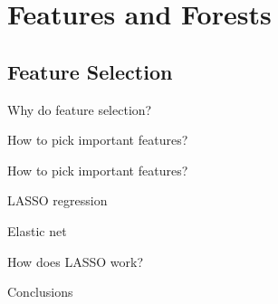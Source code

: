 \section{Features and Forests}
\subsection{Feature Selection}
\begin{frame}[t]{Why do feature selection?}

\end{frame}
\begin{frame}[t]{How to pick important features?}

\end{frame}
\begin{frame}[t]{How to pick important features?}

\end{frame}
\begin{frame}[t]{LASSO regression}

\end{frame}
\begin{frame}[t]{Elastic net}

\end{frame}
\begin{frame}[t]{How does LASSO work?}

\end{frame}
\begin{frame}[t]{Conclusions}

\end{frame}
